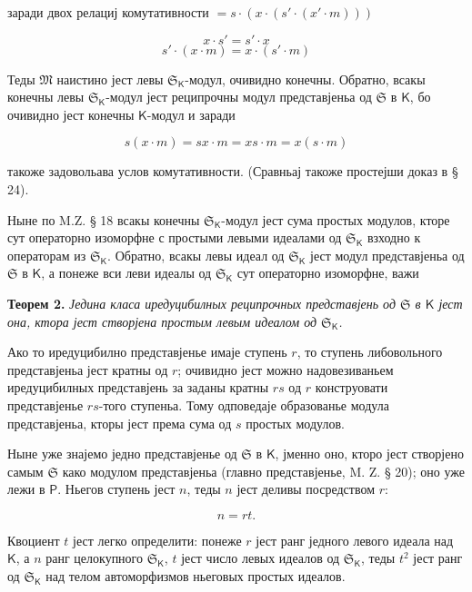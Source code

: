 \documentclass[11pt]{article}
\begin{document}
заради двох релациј комутативности \(=s\cdot(x\cdot(s'\cdot(x'\cdot m)))\)

\[
x\cdot s'=s'\cdot x
\]
\[
s'\cdot(x\cdot m)=x\cdot(s'\cdot m)
\]

Теды \(\mathfrak M\) наистино јест левы \(\mathfrak S_{\mathsf K}\)-модул, очивидно конечны. Обратно, всакы конечны левы \(\mathfrak S_{\mathsf K}\)-модул јест реципрочны модул представјеньа од \(\mathfrak S\) в \(\mathsf K\), бо очивидно јест конечны \(\mathsf K\)-модул и заради

\[
s(x\cdot m)=sx\cdot m=xs\cdot m=x(s\cdot m)
\]

такоже задовольава услов комутативности. (Сравньај такоже простејши доказ в § 24).

Ныне по M.Z. § 18 всакы конечны \(\mathfrak S_{\mathsf K}\)-модул јест сума простых модулов, кторе сут операторно изоморфне с простыми левыми идеалами од \(\mathfrak S_{\mathsf K}\) взходно к операторам из \(\mathfrak S_{\mathsf K}\). Обратно, всакы левы идеал од \(\mathfrak S_{\mathsf K}\) јест модул представјеньа од \(\mathfrak S\) в \(\mathsf K\), а понеже вси леви идеалы од \(\mathfrak S_{\mathsf K}\) сут операторно изоморфне, важи

\textbf{Теорем 2.} \emph{Једина класа иредуцибилных реципрочных представјень од \(\mathfrak S\) в \(\mathsf K\) јест она, ктора јест створјена простым левым идеалом од \(\mathfrak S_{\mathsf K}\).}

Ако то иредуцибилно представјенье имаје ступень \(r\), то ступень либовольного представјеньа јест кратны од \(r\); очивидно јест можно надовезиваньем иредуцибилных представјень за заданы кратны \(rs\) од \(r\) конструовати представјенье \(rs\)-того ступеньа. Тому одповедаје образованье модула представјеньа, кторы јест према сума од \(s\) простых модулов.

Ныне уже знајемо једно представјенье од \(\mathfrak S\) в \(\mathsf K\), јменно оно, кторо јест створјено самым \(\mathfrak S\) како модулом представјеньа (главно представјенье, M. Z. § 20); оно уже лежи в \(\mathsf P\). Ньегов ступень јест \(n\), теды \(n\) јест деливы посредством \(r\):

\[
n=rt.
\]

Квоциент \(t\) јест легко определити: понеже \(r\) јест ранг једного левого идеала над \(\mathsf K\), а \(n\) ранг целокупного \(\mathfrak S_{\mathsf K}\), \(t\) јест число левых идеалов од \(\mathfrak S_{\mathsf K}\), теды \(t^2\) јест ранг од \(\mathfrak S_{\mathsf K}\) над телом автоморфизмов ньеговых простых идеалов.
\end{document}
